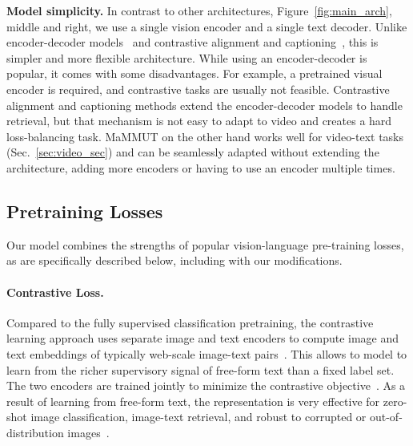 \documentclass[10pt]{article} \usepackage[accepted]{tmlr}
\newcommand{\ours}{MaMMUT\xspace}
\begin{document}
\textbf{Model simplicity.}
In contrast to other architectures, Figure~\ref{fig:main_arch}, middle and right, we use a single vision encoder and a single text decoder. Unlike encoder-decoder models~\citep{pali,wang2022git,wang2022image} and contrastive alignment and captioning~\citep{albef,yu2022coca}, this is simpler and more flexible architecture. While using an encoder-decoder is popular, it comes with some disadvantages. For example, a pretrained visual encoder is  required, and contrastive tasks are usually not feasible. Contrastive alignment and captioning methods extend the encoder-decoder models to handle retrieval, but that mechanism is not easy to adapt to video and creates a hard loss-balancing task. 
\ours on the other hand works well for video-text tasks (Sec.~\ref{sec:video_sec}) and can be seamlessly adapted without extending the architecture, adding more encoders or having to use an encoder multiple times. 


\subsection{Pretraining Losses}
Our model combines the strengths of popular vision-language pre-training losses, as are specifically described below, including with our modifications. 


\paragraph{Contrastive Loss.}\quad Compared to the fully supervised classification pretraining, the contrastive learning approach uses separate image and text encoders to compute image and text embeddings of typically web-scale image-text pairs~\citep{radford2021clip,align,yu2022coca,zhai2021lit}. This allows to model to learn from the richer supervisory signal of free-form text than a fixed label set. The two encoders are trained jointly to minimize the contrastive objective~\citep{oord2018representation,radford2021clip,align}.
As a result of learning from free-form text, the representation is very effective for zero-shot image classification, image-text retrieval, and robust to corrupted or out-of-distribution images~\citep{radford2021clip}.
\end{document}
